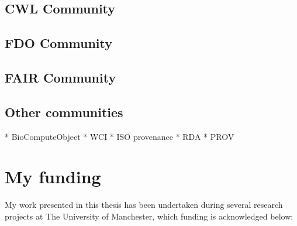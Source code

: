 
\subsection{CWL Community}


\subsection{FDO Community}


\subsection{FAIR Community}


\subsection{Other communities}

* BioComputeObject
* WCI 
* ISO provenance %
* RDA
* PROV 


\section{My funding}

My work presented in this thesis has been undertaken during 
several research projects at The University of Manchester, 
which funding is acknowledged below:

